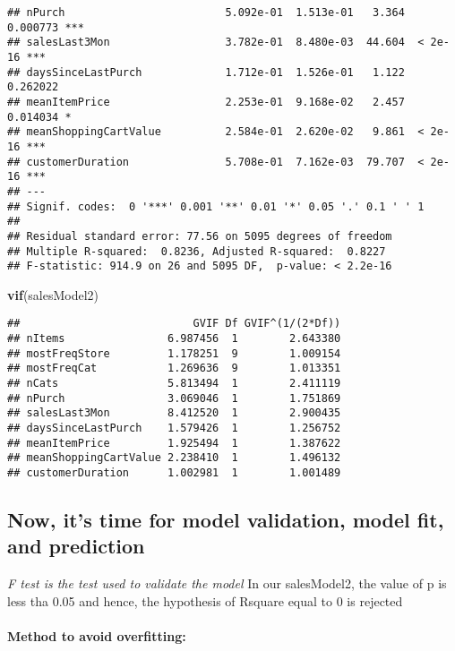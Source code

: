 \documentclass[
]{article}
\newenvironment{Shaded}{\begin{snugshade}}{\end{snugshade}}
\newcommand{\KeywordTok}[1]{\textcolor[rgb]{0.13,0.29,0.53}{\textbf{#1}}}
\newcommand{\NormalTok}[1]{#1}
\begin{document}
\begin{verbatim}
## nPurch                         5.092e-01  1.513e-01   3.364 0.000773 ***
## salesLast3Mon                  3.782e-01  8.480e-03  44.604  < 2e-16 ***
## daysSinceLastPurch             1.712e-01  1.526e-01   1.122 0.262022    
## meanItemPrice                  2.253e-01  9.168e-02   2.457 0.014034 *  
## meanShoppingCartValue          2.584e-01  2.620e-02   9.861  < 2e-16 ***
## customerDuration               5.708e-01  7.162e-03  79.707  < 2e-16 ***
## ---
## Signif. codes:  0 '***' 0.001 '**' 0.01 '*' 0.05 '.' 0.1 ' ' 1
## 
## Residual standard error: 77.56 on 5095 degrees of freedom
## Multiple R-squared:  0.8236, Adjusted R-squared:  0.8227 
## F-statistic: 914.9 on 26 and 5095 DF,  p-value: < 2.2e-16
\end{verbatim}

\begin{Shaded}
\begin{Highlighting}[]
\KeywordTok{vif}\NormalTok{(salesModel2)}
\end{Highlighting}
\end{Shaded}

\begin{verbatim}
##                           GVIF Df GVIF^(1/(2*Df))
## nItems                6.987456  1        2.643380
## mostFreqStore         1.178251  9        1.009154
## mostFreqCat           1.269636  9        1.013351
## nCats                 5.813494  1        2.411119
## nPurch                3.069046  1        1.751869
## salesLast3Mon         8.412520  1        2.900435
## daysSinceLastPurch    1.579426  1        1.256752
## meanItemPrice         1.925494  1        1.387622
## meanShoppingCartValue 2.238410  1        1.496132
## customerDuration      1.002981  1        1.001489
\end{verbatim}

\hypertarget{now-its-time-for-model-validation-model-fit-and-prediction}{%
\subsection{Now, it's time for model validation, model fit, and
prediction}\label{now-its-time-for-model-validation-model-fit-and-prediction}}

\emph{F test is the test used to validate the model} In our salesModel2,
the value of p is less tha 0.05 and hence, the hypothesis of Rsquare
equal to 0 is rejected

\hypertarget{method-to-avoid-overfitting}{%
\paragraph{Method to avoid
overfitting:}\label{method-to-avoid-overfitting}}
\end{document}
